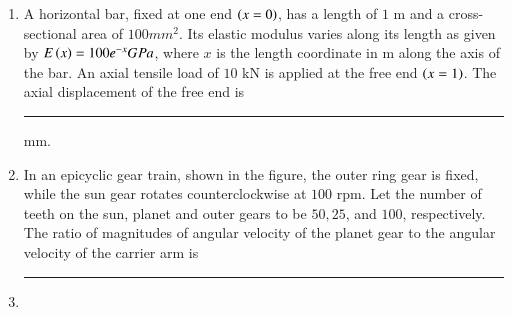 \documentclass[journal]{IEEEtran}
\begin{document}
\begin{enumerate}
{\begin{figure}[H]
\label{fig:my_label}
\end{figure}
}
\item{
A horizontal bar, fixed at one end $\left(x = 0\right)$, has a length of $1$ m and a cross-sectional area of $100mm^2$. Its elastic modulus varies along its length as given by $E\left(x\right)=100e^{-x}GPa$, where $x$ is the length coordinate in m along the axis of the bar. An axial tensile load of $10$ kN is applied at the free end $\left(x=1\right)$. The axial displacement of the free end is \rule{2cm}{0.15mm} mm.}
\item{
In an epicyclic gear train, shown in the figure, the outer ring gear is fixed, while the sun gear rotates counterclockwise at $100$ rpm. Let the number of teeth on the sun, planet and outer gears to be $50, 25$, and $100$, respectively. The ratio of magnitudes of angular velocity of the planet gear to the angular velocity of the carrier arm is \rule{3cm}{0.15mm}
\begin{figure}[H]
\centering
{}%

\label{fig:my_label}
\end{figure}}
\item{

}
\end{enumerate}
\end{document}

